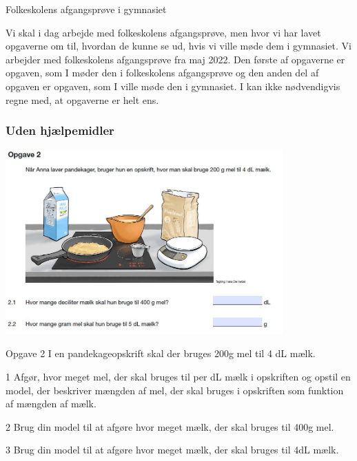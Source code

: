 \begin{center}
\Huge
Folkeskolens afgangsprøve i gymnasiet
\end{center}
Vi skal i dag arbejde med folkeskolens afgangsprøve, men hvor vi har lavet opgaverne om til, hvordan de kunne se ud, hvis vi ville møde dem i gymnasiet. Vi arbejder med folkeskolens afgangsprøve fra maj 2022. Den første af opgaverne er opgaven, som I møder den i folkeskolens afgangsprøve og den anden del af opgaven er opgaven, som I ville møde den i gymnasiet. I kan
ikke nødvendigvis regne med, at opgaverne er helt ens. 

\subsubsection*{Uden hjælpemidler}

\begin{center}
	\includegraphics[width = 0.8\textwidth]{Billeder/opg2fsk}
\end{center}

\begin{opgavetekst}{Opgave 2}
	I en pandekageopskrift skal der bruges 200g mel til 4 dL mælk.
\end{opgavetekst}

\begin{delopgave}{}{1}
	Afgør, hvor meget mel, der skal bruges til per dL mælk i opskriften og opstil en model, der
	beskriver mængden af mel, der skal bruges i opskriften som funktion af mængden af mælk. 
\end{delopgave}
\begin{delopgave}{}{2}
	Brug din model til at afgøre hvor meget mælk, der skal bruges til 400g mel.
\end{delopgave}
\begin{delopgave}{}{3}
	Brug din model til at afgøre hvor meget mælk, der skal bruges til 4dL mælk. 
\end{delopgave}

